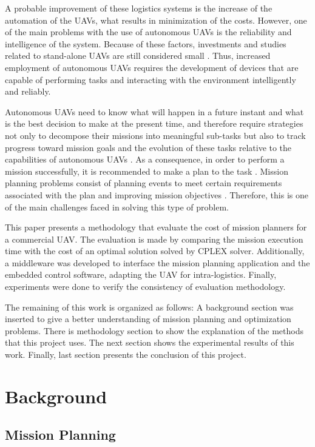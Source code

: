 \documentclass[conference,harvard,brazil,english]{sbatex}
\begin{document}
A probable improvement of these logistics systems is the increase of the automation of the UAVs, what results in minimization of the costs. However, one of the main problems with the use of autonomous UAVs is the reliability and intelligence of the system. Because of these factors, investments and studies related to stand-alone UAVs are still considered small \cite{hern2014dhl}. Thus, increased employment of autonomous UAVs requires the development of devices that are capable of performing tasks and interacting with the environment intelligently and reliably.

Autonomous UAVs need to know what will happen in a future instant and what is the best decision to make at the present time, and therefore require strategies not only to decompose their missions into meaningful sub-tasks but also to track progress toward mission goals and the evolution of these tasks relative to the capabilities of autonomous UAVs \cite{finn2012developments}. As a consequence, in order to perform a mission successfully, it is recommended to make a plan to the task \cite{successplan}. Mission planning problems consist of planning events to meet certain requirements associated with the plan and improving mission objectives \cite{krozel1988search}. Therefore, this is one of the main challenges faced in solving this type of problem.

This paper presents a methodology that evaluate the cost of mission planners for a commercial UAV. The evaluation is made by comparing the mission execution time with the cost of an optimal solution solved by CPLEX solver. Additionally, a middleware was developed to interface the mission planning application and the embedded control software, adapting the UAV for intra-logistics. Finally, experiments were done to verify the consistency of evaluation methodology.

The remaining of this work is organized as follows: A background section was inserted to give a better understanding of mission planning and optimization problems. There is methodology section to show the explanation of the methods that this project uses. The next section shows the experimental results of this work. Finally, last section presents the conclusion of this project.

\section{Background}
\label{sec:background}

\subsection{Mission Planning}
\label{subsec:missionplanning}
\end{document}
